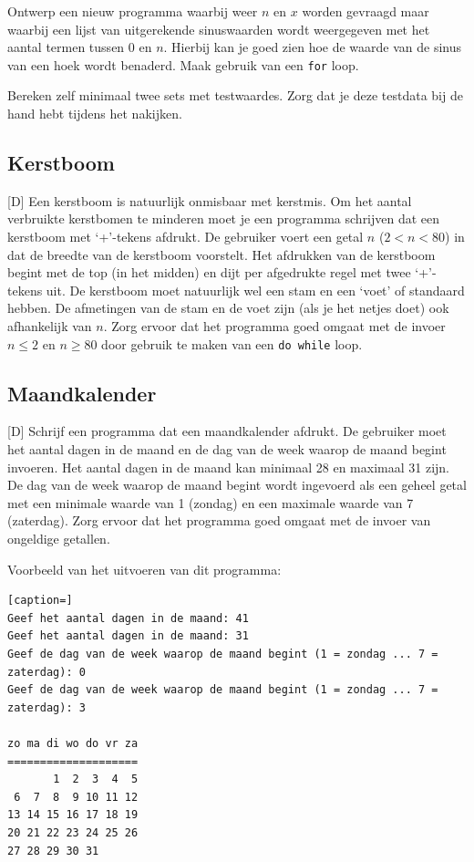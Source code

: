 \documentclass[a4paper,10pt,fleqn,twoside]{article}
\begin{document}
Ontwerp een nieuw programma waarbij weer $n$ en $x$ worden gevraagd maar waarbij een lijst van uitgerekende sinuswaarden wordt weergegeven met het aantal termen tussen $0$ en $n$. Hierbij kan je goed zien hoe de waarde van de sinus van een hoek wordt benaderd. Maak gebruik van een \lstinline|for| loop.

Bereken zelf minimaal twee sets met testwaardes. Zorg dat je deze testdata bij de hand hebt tijdens het nakijken.

\subsection{Kerstboom}[D]
Een kerstboom is natuurlijk onmisbaar met kerstmis. Om het aantal verbruikte kerstbomen te minderen moet je een programma schrijven dat een kerstboom met `+’-tekens afdrukt. De gebruiker voert een getal $n$ ($2 < n < 80$) in dat de breedte van de kerstboom voorstelt. Het afdrukken van de kerstboom begint met de top (in het midden) en dijt per afgedrukte regel met twee `+’-tekens uit. De kerstboom moet natuurlijk wel een stam en een ‘voet’ of standaard hebben. De afmetingen van de stam en de voet zijn (als je het netjes doet) ook afhankelijk van $n$. Zorg ervoor dat het programma goed omgaat met de invoer $n \leq 2$ en $n \geq 80$ door gebruik te maken van een \lstinline|do while| loop.

\subsection{Maandkalender}[D]
Schrijf een programma dat een maandkalender afdrukt. De gebruiker moet het aantal dagen in de maand en de dag van de week waarop de maand begint invoeren. Het aantal dagen in de maand kan minimaal 28 en maximaal 31 zijn. De dag van de week waarop de maand begint wordt ingevoerd als een geheel getal met een minimale waarde van 1 (zondag) en een maximale waarde van 7 (zaterdag). Zorg ervoor dat het programma goed omgaat met de invoer van ongeldige getallen.

Voorbeeld van het uitvoeren van dit programma:

\begin{lstlisting}[caption=]
Geef het aantal dagen in de maand: 41
Geef het aantal dagen in de maand: 31
Geef de dag van de week waarop de maand begint (1 = zondag ... 7 = zaterdag): 0
Geef de dag van de week waarop de maand begint (1 = zondag ... 7 = zaterdag): 3

zo ma di wo do vr za
====================
       1  2  3  4  5
 6  7  8  9 10 11 12
13 14 15 16 17 18 19
20 21 22 23 24 25 26
27 28 29 30 31
\end{lstlisting}
\end{document}
